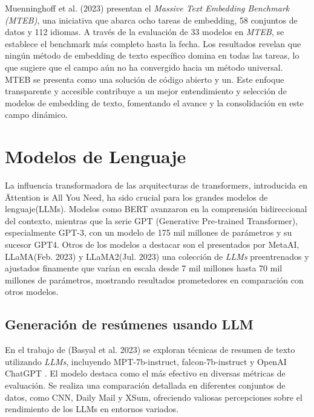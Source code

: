     Muenninghoff et al. (2023)\cite{muennighoff2023mteb} presentan el \emph{Massive Text Embedding Benchmark (MTEB)}, una iniciativa que abarca ocho tareas de embedding, 58 conjuntos de datos y 112 idiomas. A través de la evaluación de 33 modelos en \emph{MTEB}, se establece el benchmark más completo hasta la fecha. Los resultados revelan que ningún método de embedding de texto específico domina en todas las tareas, lo que sugiere que el campo aún no ha convergido hacia un método universal. MTEB se presenta como una solución de código abierto y un\cite[leaderboard público]{leaderboard}. Este enfoque transparente y accesible contribuye a un mejor entendimiento y selección de modelos de embedding de texto, fomentando el avance y la consolidación en este campo dinámico.

\section{Modelos de Lenguaje}
   
    La influencia transformadora de las arquitecturas de transformers, introducida en \"Attention is All You Need\" \cite{attention}, ha sido crucial para los grandes modelos de lenguaje(LLMs). Modelos como BERT\cite{BERT} avanzaron en la comprensión bidireccional del contexto, mientras que la serie GPT (Generative Pre-trained Transformer), especialmente GPT-3\cite{brown2020language}, con un modelo de 175 mil millones de parámetros y su sucesor GPT4\cite{openai2023gpt4}. Otros de los modelos a destacar son el presentados por MetaAI, LLaMA(Feb. 2023)\cite{llamapaper} y LLaMA2(Jul. 2023)\cite{llamapaper2} una colección de \emph{LLMs} preentrenados y ajustados finamente que varían en escala desde 7 mil millones hasta 70 mil millones de parámetros, mostrando resultados prometedores en comparación con otros modelos\cite{metallama}. 
    
    \subsection{Generación de resúmenes usando LLM}

    En el trabajo de (Basyal et al. 2023)\cite{basyal2023text} se exploran técnicas de resumen de texto utilizando \emph{LLMs}, incluyendo MPT-7b-instruct\cite{mpt}, falcon-7b-instruct\cite{falcon} y OpenAI ChatGPT \cite{brown2020language}. El modelo  destaca como el más efectivo en diversas métricas de evaluación. Se realiza una comparación detallada en diferentes conjuntos de datos, como CNN, Daily Mail y XSum, ofreciendo valiosas percepciones sobre el rendimiento de los LLMs en entornos variados. 

